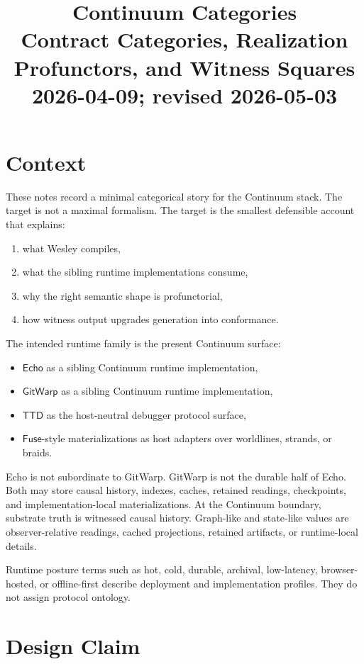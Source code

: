 \documentclass[11pt]{article}
\title{Continuum Categories\\[6pt]
\large Contract Categories, Realization Profunctors, and Witness Squares\\[3pt]
\normalsize 2026-04-09; revised 2026-05-03}
\author{}
\date{}
\newcommand{\TTD}{\ensuremath{\mathsf{TTD}}}
\newcommand{\Echo}{\ensuremath{\mathsf{Echo}}}
\newcommand{\GitWarp}{\ensuremath{\mathsf{GitWarp}}}
\newcommand{\Fuse}{\ensuremath{\mathsf{Fuse}}}
\theoremstyle{definition}
\begin{document}
\maketitle

\section{Context}

These notes record a minimal categorical story for the Continuum stack.
The target is not a maximal formalism. The target is the smallest
defensible account that explains:
\begin{enumerate}[leftmargin=2em]
\item what Wesley compiles,
\item what the sibling runtime implementations consume,
\item why the right semantic shape is profunctorial,
\item how witness output upgrades generation into conformance.
\end{enumerate}

The intended runtime family is the present Continuum surface:
\begin{itemize}[leftmargin=2em]
\item \Echo{} as a sibling Continuum runtime implementation,
\item \GitWarp{} as a sibling Continuum runtime implementation,
\item \TTD{} as the host-neutral debugger protocol surface,
\item \Fuse{}-style materializations as host adapters over worldlines, strands,
  or braids.
\end{itemize}

Echo is not subordinate to GitWarp. GitWarp is not the durable half of Echo.
Both may store causal history, indexes, caches, retained readings, checkpoints,
and implementation-local materializations. At the Continuum boundary, substrate
truth is witnessed causal history. Graph-like and state-like values are
observer-relative readings, cached projections, retained artifacts, or
runtime-local details.

Runtime posture terms such as hot, cold, durable, archival, low-latency,
browser-hosted, or offline-first describe deployment and implementation
profiles. They do not assign protocol ontology.

\section{Design Claim}
\end{document}
